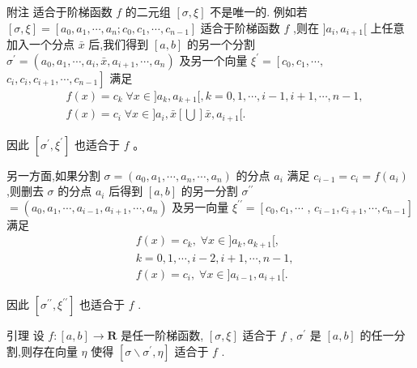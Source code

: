 附注 适合于阶梯函数 $f$ 的二元组 $\left\lbrack  {\sigma ,\xi }\right\rbrack$ 不是唯一的. 例如若 $\left\lbrack  {\sigma ,\xi }\right\rbrack   = \left\lbrack  {{a}_{0},{a}_{1},\cdots ,{a}_{n};{c}_{0},{c}_{1},\cdots ,{c}_{n - 1}}\right\rbrack$ 适合于阶梯函数 $f$ ,则在 $\rbrack {a}_{i},{a}_{i + 1}\lbrack$ 上任意加入一个分点 $\bar{x}$ 后,我们得到 $\left\lbrack  {a,b}\right\rbrack$ 的另一个分割 ${\sigma }^{\prime } = \left( {{a}_{0},{a}_{1},\cdots ,{a}_{i},\bar{x},{a}_{i + 1},\cdots ,{a}_{n}}\right)$ 及另一个向量 ${\xi }^{\prime } = \left\lbrack  {{c}_{0},{c}_{1},\cdots ,}\right.$  $\left. {{c}_{i},{c}_{i},{c}_{i + 1},\cdots ,{c}_{n - 1}}\right\rbrack$ 满足
\begin{align*}
	&f\left( x\right)  = {c}_{k}\;\forall x \in  \rbrack {a}_{k},{a}_{k + 1}\lbrack ,k = 0,1,\cdots ,i - 1,i + 1,\cdots ,n - 1,\\
	&f\left( x\right)  = {c}_{i}\;\forall x \in  \rbrack {a}_{i},\bar{x}\left\lbrack  \bigcup \right\rbrack  \bar{x},{a}_{i + 1}\lbrack .
\end{align*}

因此 $\left\lbrack  {{\sigma }^{\prime },{\xi }^{\prime }}\right\rbrack$ 也适合于 $f$ 。

另一方面,如果分割 $\sigma  = \left( {{a}_{0},{a}_{1},\cdots ,{a}_{n},\cdots ,{a}_{n}}\right)$ 的分点 ${a}_{i}$ 满足 ${c}_{i - 1} = {c}_{i} = f\left( {a}_{i}\right)$ ,则删去 $\sigma$ 的分点 ${a}_{i}$ 后得到 $\left\lbrack  {a,b}\right\rbrack$ 的另一分割 ${\sigma }^{\prime \prime }$  $= \left( {{a}_{0},{a}_{1},\cdots ,{a}_{i - 1},{a}_{i + 1},\cdots ,{a}_{n}}\right)$ 及另一向量 ${\xi }^{\prime \prime } = \left\lbrack  {{c}_{0},{c}_{1},\cdots }\right.$ , $\left. {{c}_{i - 1},{c}_{i + 1},\cdots ,{c}_{n - 1}}\right\rbrack$ 满足
\begin{align*}
	&f\left( x\right)  = {c}_{k},\;\forall x \in  \rbrack {a}_{k},{a}_{k + 1}\lbrack ,\\
	&k = 0,1,\cdots ,i - 2,i + 1,\cdots ,n - 1,\\
	&f\left( x\right)  = {c}_{i},\;\forall x \in  \rbrack {a}_{i - 1},{a}_{i + 1}\lbrack .
\end{align*}

因此 $\left\lbrack  {{\sigma }^{\prime \prime },{\xi }^{\prime \prime }}\right\rbrack$ 也适合于 $f$ .

引理 设 $f : \left\lbrack  {a,b}\right\rbrack   \rightarrow  \mathbf{R}$ 是任一阶梯函数, $\left\lbrack  {\sigma ,\xi }\right\rbrack$ 适合于 $f$ , ${\sigma }^{\prime }$ 是 $\left\lbrack  {a,b}\right\rbrack$ 的任一分割,则存在向量 $\eta$ 使得 $\left\lbrack  {\sigma  \smallsetminus  {\sigma }^{\prime },\eta }\right\rbrack$ 适合于 $f$ .

